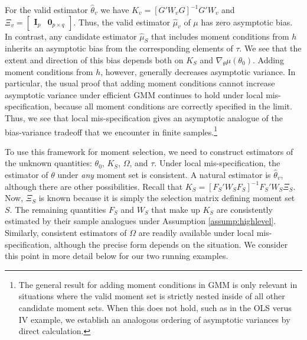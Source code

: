 \documentclass[12pt]{article}
\theoremstyle{definition}
\begin{document}
For the valid estimator $\widehat{\theta}_v$ we have $K_v = \left[G'W_{v}G\right]^{-1}G' W_{v}$ and $\Xi_v =\left[\begin{array}{cc} \mathbf{I}_p& \mathbf{0}_{p\times q} \end{array} \right]$. Thus, the valid estimator $\widehat{\mu}_v$ of $\mu$ has zero asymptotic bias. In contrast, any candidate estimator $\widehat{\mu}_S$ that includes moment conditions from $h$ inherits an asymptotic bias from the corresponding elements of $\tau$. We see that the extent and direction of this bias depends both on $K_S$ and $\nabla_\theta\mu(\theta_0)$. Adding moment conditions from $h$, however, generally decreases asymptotic variance. In particular, the usual proof that adding moment conditions cannot increase asymptotic variance under efficient GMM \citep[see for example][ch.\ 6]{Hallbook} continues to hold under local mis-specification, because all moment conditions are correctly specified in the limit. Thus, we see that local mis-specification gives an asymptotic analogue of the bias-variance tradeoff that we encounter in finite samples.\footnote{The general result for adding moment conditions in GMM is only relevant in situations where the valid moment set is strictly nested inside of all other candidate moment sets. When this does not hold, such as in the OLS verus IV example, we establish an analogous ordering of asymptotic variances by direct calculation.} 

To use this framework for moment selection, we need to construct estimators of the unknown quantities: $\theta_0$, $K_S$, $\Omega$, and $\tau$. Under local mis-specification, the estimator of $\theta$ under \emph{any} moment set is consistent. A natural estimator is $\widehat{\theta}_v$, although there are other possibilities. Recall that $K_S = [F_S'W_SF_S]^{-1} F_S'W_S \Xi_S$. Now, $\Xi_S$ is known because it is simply the selection matrix defining moment set $S$. The remaining quantities $F_S$ and $W_S$ that make up $K_S$ are consistently estimated by their sample analogues under Assumption \ref{assump:highlevel}. Similarly, consistent estimators of $\Omega$ are readily available under local mis-specification, although the precise form depends on the situation. We consider this point in more detail below for our two running examples.
\end{document}
